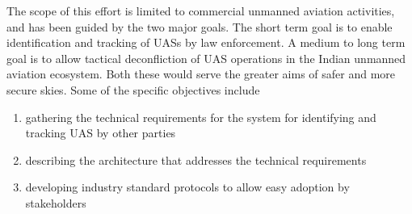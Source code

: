 \documentclass{ua_wgs_base}
\begin{document}
The scope of this effort is limited to commercial unmanned aviation
activities, and has been guided by the two major goals. The short
term goal is to enable identification and tracking of UASs by law
enforcement. A medium to long term goal is to allow tactical deconfliction
of UAS operations in the Indian unmanned aviation ecosystem. Both
these would serve the greater aims of safer and more secure skies.
Some of the specific objectives include
\begin{enumerate}
\item gathering the technical requirements for the system for identifying
and tracking UAS by other parties
\item describing the architecture that addresses the technical requirements
\item developing industry standard protocols to allow easy adoption by stakeholders
\end{enumerate}
\end{document}
